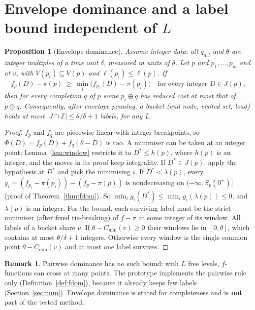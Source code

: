 \documentclass[11pt]{article}
\newtheorem{proposition}[theorem]{Proposition}
\theoremstyle{definition}
\newtheorem{remark}[theorem]{Remark}
\begin{document}
\section{Envelope dominance and a label bound independent of $L$}\label{sec:envelope}

\begin{proposition}[Envelope dominance]\label{prop:env}
Assume integer data: all $q_{a,l}$ and $\theta$ are integer multiples of a time unit $\delta$, measured in units of $\delta$. Let $p$ and $p_1,\dots,p_m$ end at $v$, with $V(p_i)\subseteq V(p)$ and $\ell(p_i)\le\ell(p)$. If
\[
f_p(D)-\pi(p)\ \ge\ \min_i\big(f_{p_i}(D)-\pi(p_i)\big)\quad\text{for every integer }D\in J(p),
\]
then for every completion $q$ of $p$ some $p_i\oplus q$ has reduced cost at most that of $p\oplus q$. Consequently, after envelope pruning, a bucket (end node, visited set, load) holds at most $|J\cap\mathbb Z|\le\theta/\delta+1$ labels, for any $L$.
\end{proposition}
\begin{proof}
$f_p$ and $f_q$ are piecewise linear with integer breakpoints, so $\Phi(D)=f_p(D)+f_q(\theta-D)$ is too. A minimiser can be taken at an integer point; Lemma~\ref{lem:window} restricts it to $D^*\le h(p)$, where $h(p)$ is an integer, and the moves in its proof keep integrality. If $D^*\in J(p)$, apply the hypothesis at $D^*$ and pick the minimising $i$. If $D^*<\lambda(p)$, every $g_i=(f_{p_i}-\pi(p_i))-(f_p-\pi(p))$ is nondecreasing on $(-\infty,S_p(0^+)]$ (proof of Theorem~\ref{thm:fdom}). So $\min_ig_i(D^*)\le\min_ig_i(\lambda(p))\le0$, and $\lambda(p)$ is an integer. For the bound, each surviving label must be the strict minimiser (after fixed tie-breaking) of $f-\pi$ at some integer of its window. All labels of a bucket share $v$. If $\theta-C_{\min}(v)\ge0$ their windows lie in $[0,\theta]$, which contains at most $\theta/\delta+1$ integers. Otherwise every window is the single common point $\theta-C_{\min}(v)$ and at most one label survives.
\end{proof}

\begin{remark}
Pairwise dominance has no such bound: with $L$ free levels, $f$-functions can cross at many points. The prototype implements the pairwise rule only (Definition~\ref{def:fdom}), because it already keeps few labels (Section~\ref{sec:num}). Envelope dominance is stated for completeness and is \textbf{not} part of the tested method.
\end{remark}
\end{document}
